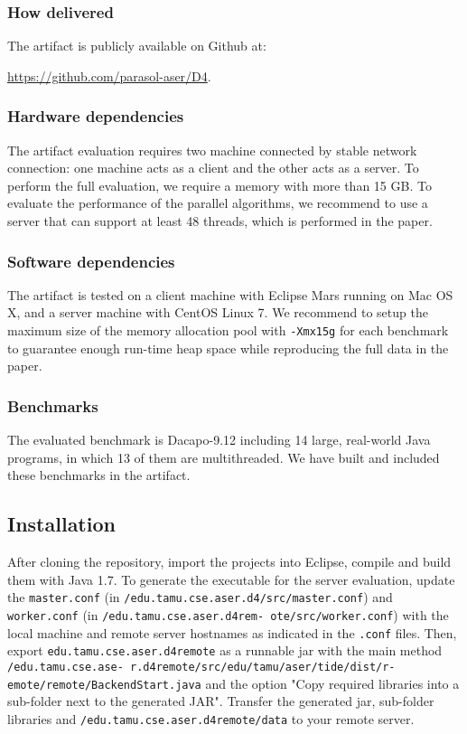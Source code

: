 \documentclass[preprint, number, 10pt]{sigplanconf}
\begin{document}
\subsubsection{How delivered}
The artifact is publicly available on Github at: 

\href{https://github.com/parasol-aser/D4}{https://github.com/parasol-aser/D4}.

\subsubsection{Hardware dependencies}
The artifact evaluation requires two machine connected by stable network connection: one machine acts as a client and the other acts as a server. To perform the full evaluation, we require a memory with more than 15 GB. To evaluate the performance of the parallel algorithms, we recommend to use a server that can support at least 48 threads, which is performed in the paper.

\subsubsection{Software dependencies}
The artifact is tested on a client machine with Eclipse Mars running on Mac OS X, and a server machine with CentOS Linux 7. We recommend to setup
the maximum size of the memory allocation pool with \texttt{-Xmx15g} for each benchmark to guarantee enough run-time heap space while reproducing the full data in the paper.

\subsubsection{Benchmarks}
The evaluated benchmark is Dacapo-9.12 including 14 large, real-world Java programs, in which 13 of them are multithreaded. We have built and included these benchmarks in the artifact. 
 
\subsection{Installation}
After cloning the repository, import the projects into Eclipse, compile and build them with Java 1.7. To generate the executable for the server evaluation, update the \texttt{master.conf} (in \texttt{/edu.tamu.cse.aser.d4/src/master.conf}) and \texttt{worker.conf} (in \texttt{/edu.tamu.cse.aser.d4rem-
ote/src/worker.conf}) with the local machine and remote server hostnames as indicated in the \texttt{.conf} files. Then, export \texttt{edu.tamu.cse.aser.d4remote} as a runnable jar with the main method \texttt{/edu.tamu.cse.ase-
r.d4remote/src/edu/tamu/aser/tide/dist/r-
emote/remote/BackendStart.java} and the option "Copy required libraries into a sub-folder next to the generated JAR". Transfer the generated jar, sub-folder libraries and \texttt{/edu.tamu.cse.aser.d4remote/data} to your remote server.
\end{document}
